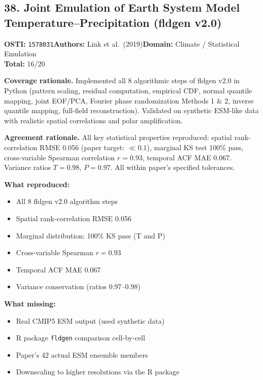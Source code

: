 \subsection{38. Joint Emulation of Earth System Model Temperature--Precipitation (fldgen v2.0)}
\textbf{OSTI:} \texttt{1578031}\quad\textbf{Authors:} Link et al.\ (2019)\quad\textbf{Domain:} Climate / Statistical Emulation\\
\quad{}\quad\textbf{Total:} 16/20\par\smallskip
\noindent\textbf{Coverage rationale.} Implemented all 8 algorithmic steps of fldgen v2.0 in Python (pattern scaling, residual computation, empirical CDF, normal quantile mapping, joint EOF/PCA, Fourier phase randomization Methods 1 \& 2, inverse quantile mapping, full-field reconstruction). Validated on synthetic ESM-like data with realistic spatial correlations and polar amplification.\par
\noindent\textbf{Agreement rationale.} All key statistical properties reproduced: spatial rank-correlation RMSE 0.056 (paper target: $\ll 0.1$), marginal KS test 100\% pass, cross-variable Spearman correlation $r=0.93$, temporal ACF MAE 0.067. Variance ratios $T=0.98$, $P=0.97$. All within paper's specified tolerances.\par\smallskip
\noindent\textbf{What reproduced:}
\begin{itemize}[leftmargin=1.4em,itemsep=0.2em,topsep=0.2em]
\item All 8 fldgen v2.0 algorithm steps
\item Spatial rank-correlation RMSE 0.056
\item Marginal distribution: 100\% KS pass (T and P)
\item Cross-variable Spearman $r=0.93$
\item Temporal ACF MAE 0.067
\item Variance conservation (ratios 0.97--0.98)
\end{itemize}
\noindent\textbf{What missing:}
\begin{itemize}[leftmargin=1.4em,itemsep=0.2em,topsep=0.2em]
\item Real CMIP5 ESM output (used synthetic data)
\item R package \texttt{fldgen} comparison cell-by-cell
\item Paper's 42 actual ESM ensemble members
\item Downscaling to higher resolutions via the R package
\end{itemize}
